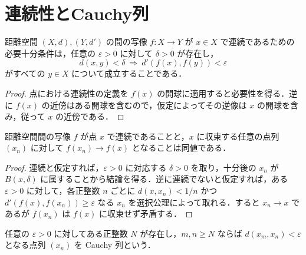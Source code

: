 \section{連続性とCauchy列}
\begin{prop}
距離空間 $(X,d),(Y,d')$ の間の写像 $f:X\to Y$ が $x\in X$ で連続であるための必要十分条件は，任意の $\varepsilon>0$ に対して $\delta>0$ が存在し，
\[
 d(x,y)<\delta\ \Longrightarrow\ d'(f(x),f(y))<\varepsilon
\]
がすべての $y\in X$ について成立することである．
\end{prop}
\begin{proof}
点における連続性の定義を $f(x)$ の開球に適用すると必要性を得る．逆に $f(x)$ の近傍はある開球を含むので，仮定によってその逆像は $x$ の開球を含み，従って $x$ の近傍である．
\end{proof}
\begin{prop}[連続性の点列による判定]
距離空間間の写像 $f$ が点 $x$ で連続であることと，$x$ に収束する任意の点列 $(x_n)$ に対して $f(x_n)\to f(x)$ となることは同値である．
\end{prop}
\begin{proof}
連続と仮定すれば，$\varepsilon>0$ に対応する $\delta>0$ を取り，十分後の $x_n$ が $B(x,\delta)$ に属することから結論を得る．逆に連続でないと仮定すれば，ある $\varepsilon>0$ に対して，各正整数 $n$ ごとに $d(x,x_n)<1/n$ かつ $d'(f(x),f(x_n))\geq\varepsilon$ なる $x_n$ を選択公理によって取れる．すると $x_n\to x$ であるが $f(x_n)$ は $f(x)$ に収束せず矛盾する．
\end{proof}
\begin{defn}[Cauchy列]
任意の $\varepsilon>0$ に対してある正整数 $N$ が存在し，$m,n\geq N$ ならば $d(x_m,x_n)<\varepsilon$ となる点列 $(x_n)$ を Cauchy 列という．
\end{defn}
